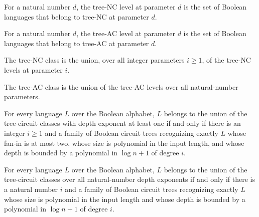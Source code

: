 \begin{definition}
\label{BoolCircuit.TreeNCLevel}
\leanok
{}
For a natural number $d$, the tree-NC level at parameter $d$ is the set of Boolean
languages that belong to tree-NC at parameter $d$.
\end{definition}

\begin{definition}
\label{BoolCircuit.TreeACLevel}
\leanok
{}
For a natural number $d$, the tree-AC level at parameter $d$ is the set of Boolean
languages that belong to tree-AC at parameter $d$.
\end{definition}

\begin{definition}
\label{BoolCircuit.TreeNC}
\leanok
{}
The tree-NC class is the union, over all integer parameters $i \ge 1$, of the tree-NC
levels at parameter $i$.
\end{definition}

\begin{definition}
\label{BoolCircuit.TreeAC}
\leanok
{}
The tree-AC class is the union of the tree-AC levels over all natural-number parameters.
\end{definition}

\begin{theorem}
\label{BoolCircuit.mem_TreeNC_iff}
\leanok
{}
For every language $L$ over the Boolean alphabet, $L$ belongs to the union of the
tree-circuit classes with depth exponent at least one if and only if there is an integer
$i\ge 1$ and a family of Boolean circuit trees recognizing exactly $L$ whose fan-in is
at most two, whose size is polynomial in the input length, and whose depth is bounded by
a polynomial in $\log n+1$ of degree $i$.
\end{theorem}

\begin{theorem}
\label{BoolCircuit.mem_TreeAC_iff}
\leanok
{}
For every language $L$ over the Boolean alphabet, $L$ belongs to the union of the
tree-circuit classes over all natural-number depth exponents if and only if there is a
natural number $i$ and a family of Boolean circuit trees recognizing exactly $L$ whose
size is polynomial in the input length and whose depth is bounded by a polynomial in
$\log n+1$ of degree $i$.
\end{theorem}

